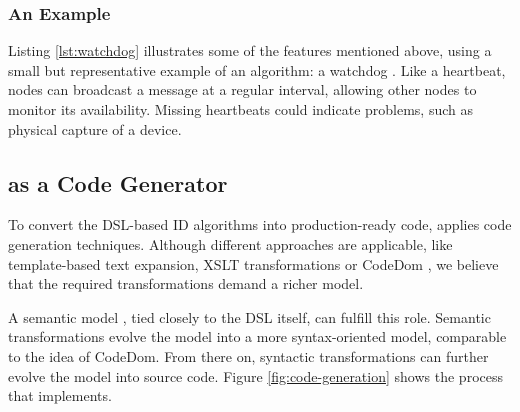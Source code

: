 \documentclass[3p,times,procedia]{elsarticle}
\begin{document}
\subsubsection{An Example}

Listing \ref{lst:watchdog} illustrates some of the features mentioned above,
using a small but representative example of an algorithm: a watchdog
\cite{mishra2004intrusion}. Like a heartbeat, nodes can broadcast a message at
a regular interval, allowing other nodes to monitor its availability. Missing
heartbeats could indicate problems, such as physical capture of a device.



\subsection{\NAME as a Code Generator}
\label{code-generator-design}

To convert the DSL-based ID algorithms into production-ready code, \NAME
applies code generation techniques. Although different approaches are
applicable, like template-based text expansion, XSLT transformations or CodeDom
\cite{dollard2004code}, we believe that the required transformations demand a
richer model.

A semantic model \cite{fowler2010domain}, tied closely to the DSL itself, can
fulfill this role. Semantic transformations evolve the model into a more
syntax-oriented model, comparable to the idea of CodeDom. From there on,
syntactic transformations can further evolve the model into source code. Figure
\ref{fig:code-generation} shows the process that \NAME implements.
\end{document}

